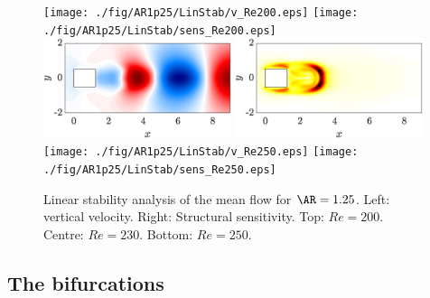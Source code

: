 \begin{figure}
  \centering
  \texttt{[image: ./fig/AR1p25/LinStab/v\_Re200.eps]}
  \texttt{[image: ./fig/AR1p25/LinStab/sens\_Re200.eps]}
  \includegraphics[width=0.49\textwidth]{./fig/AR1p25/LinStab/v_Re230.eps}
  \includegraphics[width=0.49\textwidth]{./fig/AR1p25/LinStab/sens_Re230.eps}
  \texttt{[image: ./fig/AR1p25/LinStab/v\_Re250.eps]}
  \texttt{[image: ./fig/AR1p25/LinStab/sens\_Re250.eps]}
  \caption{Linear stability analysis of the mean flow for $\AR=1.25$. Left: vertical velocity. Right: Structural sensitivity. Top: $Re=200$. Centre: $Re=230$. Bottom: $Re=250$.}
  \label{fig:MF_stab}
\end{figure}

\subsection{The bifurcations}

